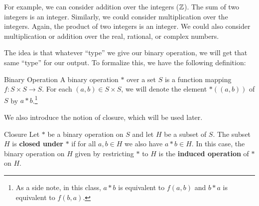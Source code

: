 \documentclass[letterpaper]{article}
\begin{document}
\bigskip 

For example, we can consider addition over the integers ($\mathbb{Z}$). The sum of two integers is an integer. Similarly, we could consider multiplication over the integers. Again, the product of two integers is an integer. We could also consider multiplication or addition over the real, rational, or complex numbers. 

\bigskip 

The idea is that whatever ``type'' we give our binary operation, we will get that same ``type'' for our output. To formalize this, we have the following definition:  
\begin{definition}{Binary Operation}{}
    A binary operation $*$ over a set $S$ is a function mapping $f: S \times S \to S$. For each $(a, b) \in S \times S$, we will denote the element $*((a, b))$ of $S$ by $a * b$.\footnote{As a side note, in this class, $a * b$ is equivalent to $f(a, b)$ and $b * a$ is equivalent to $f(b, a)$.}
\end{definition}

We also introduce the notion of closure, which will be used later. 
\begin{definition}{Closure}{}
    Let $*$ be a binary operation on $S$ and let $H$ be a subset of $S$. The subset $H$ is \textbf{closed under} $*$ if for all $a, b \in H$ we also have $a * b \in H$. In this case, the binary operation on $H$ given by restricting $*$ to $H$ is the \textbf{induced operation} of $*$ on $H$.
\end{definition}
\end{document}
